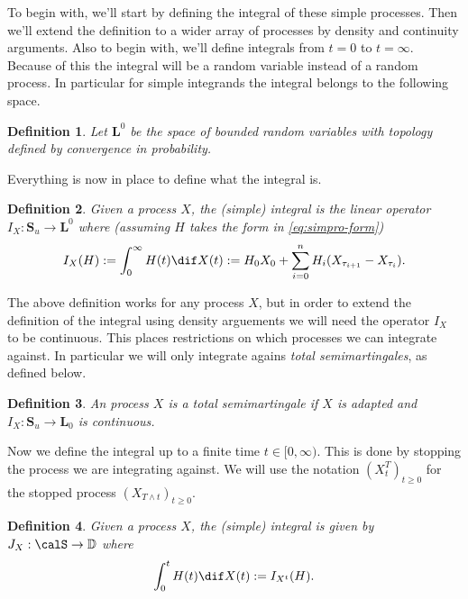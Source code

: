 \documentclass{scrreprt}
\theoremstyle{mydefn}
\newtheorem{defn}{Definition}
\theoremstyle{remark}
\newcommand{\simpro}{\mathbf S}
\newcommand{\cadspace}{\mathbb D}
\newcommand\defeq{:=}
\begin{document}
To begin with, we'll start by defining the integral of these simple processes. Then we'll extend the definition to a wider array of processes by density and continuity arguments. Also to begin with, we'll define integrals from $t = 0$ to $t = \infty$. Because of this the integral will be a random variable instead of a random process. In particular for simple integrands the integral belongs to the following space.

\begin{defn}
	Let $\mathbf L^0$ be the space of bounded random variables with topology defined by convergence in probability.
\end{defn}

Everything is now in place to define what the integral is.

\begin{defn}
	Given a process $X$, the \emph{(simple) integral} is the linear operator $I_X : \simpro_u \to \mathbf L^0$ where (assuming $H$ takes the form in \vref{eq:simpro-form})
	\begin{equation}
		 I_X(H) \defeq \int_0^{\infty} H(t) \dif X(t) \defeq H_0 X_0 + \sum_{i=0}^n H_i (X_{\tau_{i+1}} - X_{\tau_i}).
	\end{equation}
\end{defn}

The above definition works for any process $X$, but in order to extend the definition of the integral using density arguements we will need the operator $I_X$ to be continuous. This places restrictions on which \cadlag{} processes we can integrate against. In particular we will only integrate agains \emph{total semimartingales}, as defined below.

\begin{defn}
	An process $X$ is a \emph{total semimartingale} if $X$ is adapted and $I_X : \mathbf S_u \to \mathbf L_0$ is continuous.
\end{defn}

Now we define the integral up to a finite time $t \in [0, \infty)$. This is done by stopping the process we are integrating against. We will use the notation $(X^T_t)_{t \geq 0}$ for the stopped process $(X_{T \wedge t})_{t \geq 0}$.

\begin{defn}
	Given a process $X$, the \emph{(simple) integral} is given by $J_X: \calS \to \cadspace$ where
	\begin{equation}
		\int_0^t H(t) \dif X(t) \defeq I_{X^t}(H).
	\end{equation}
\end{defn}
\end{document}
